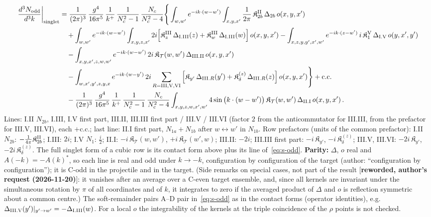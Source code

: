 {\begin{align}
\frac{d^{3}N_{\rm odd}}{d^{3}k}\bigg|_{\rm singlet}&=\frac{1}{(2\pi)^{3}}\,\frac{g^{4}}{16\pi^{5}}\,\frac{1}{k^{+}}\,\frac{1}{N_{c}^{2}-1}\,\frac{N_{c}}{N_{c}^{2}-4}\Bigg\{\int_{w,w'}e^{-ik\cdot(w-w')}\int_{x,y,x'}\frac{1}{2\pi}\,\mathfrak{K}^{\rm II}_{2b}\,\Delta_{2b}\,o(x,y,x')\notag\\
&\quad+\int_{w,w'}e^{-ik\cdot(w-w')}\int_{x,y,z,x'}2i\Big[\mathfrak{K}^{\rm III}_{z}\,\Delta_{\rm I.III}(z)+\mathfrak{K}^{\rm III}_{w}\,\Delta_{\rm I.III}(w)\Big]\,o(x,y,x')
-\int_{x,z,y,y',x',w'}e^{-ik\cdot(z-w')}\,i\,\mathfrak{K}^{\rm V}_{1}\,\Delta_{\rm I.V}\,o(y,x',y')\notag\\
&\quad-\int_{x,y,x',z,w,w'}e^{-ik\cdot(w-w')}\,2i\,\mathfrak{K}_{\mathcal{T}}(w,w')\,\Delta_{\rm III.II}\,o(x,y,x')\notag\\
&\quad-\int_{w,x',y',z,y,x}e^{-ik\cdot(w-y')}\,2i\sum_{R={\rm III,V,VI}}\Big[\mathfrak{K}_{y'}\,\Delta_{{\rm III}.R}(y')+\mathfrak{K}^{(z)}_{\delta}\,\Delta_{{\rm III}.R}(z)\Big]\,o(x,y,x')\Bigg\}+{\rm c.c.}\notag\\
&\quad-\frac{1}{(2\pi)^{3}}\,\frac{g^{4}}{16\pi^{5}}\,\frac{1}{k^{+}}\,\frac{1}{N_{c}^{2}-1}\,\frac{N_{c}}{N_{c}^{2}-4}\int_{x,y,z,w,x',w'}4\sin\big(k\cdot(w-w')\big)\,\mathfrak{K}_{\mathcal{T}}(w,w')\,\Delta_{\rm II.I}\,o(x,y,x')\,.\label{eq:s-odd}
\end{align}
Lines: I.II $N_{2b}$, I.III, I.V first part, III.II, III.III first part / III.V / III.VI (factor $2$ from the anticommutator for III.III, from the prefactor for III.V, III.VI), each $+$c.c.; last line: II.I first part, $N_{1a}+N_{1b}$ after $w\leftrightarrow w'$ in $N_{1b}$. Row prefactors (units of the common prefactor): I.II $N_{2b}$: $-\frac{1}{4\pi}\mathfrak{K}^{\rm II}_{2b}$; I.III: $2i$; I.V $N_{1}$: $\frac{i}{2}$; II.I: $-i\,\mathfrak{K}_{\mathcal{T}}(w,w')$, $+i\,\mathfrak{K}_{\mathcal{T}}(w',w)$; III.II: $-2i$; III.III first part: $-i\,\mathfrak{K}_{y'}$, $-i\,\mathfrak{K}^{(z)}_{\delta}$; III.V, III.VI: $-2i\,\mathfrak{K}_{y'}$, $-2i\,\mathfrak{K}^{(z)}_{\delta}$. The full singlet form of a cubic row is its contact form above plus its line of~\eqref{eq:s-odd}. \textbf{Parity:} $\Delta$, $o$ real and $A(-k)=-A(k)^{*}$, so each line is real and odd under $k\to-k$, configuration by configuration of the target (author: ``configuration by configuration''); it is C-odd in the projectile and in the target. (Side remarks on special cases, not part of the result [\textbf{reworded, author's request (2026-11-20)}]: it vanishes after an average over a C-even target ensemble, and, since all kernels are invariant under the simultaneous rotation by $\pi$ of all coordinates and of $k$, it integrates to zero if the averaged product of $\Delta$ and $o$ is reflection symmetric about a common centre.) The soft-remainder pairs A--D pair in~\eqref{eq:s-odd} as in the contact forms (operator identities), e.g.\ $\Delta_{\rm III.V}(y')|_{y'\to w'}=-\Delta_{\rm I.III}(w)$. For a local $o$ the integrability of the kernels at the triple coincidence of the $\rho$ points is not checked.

}
